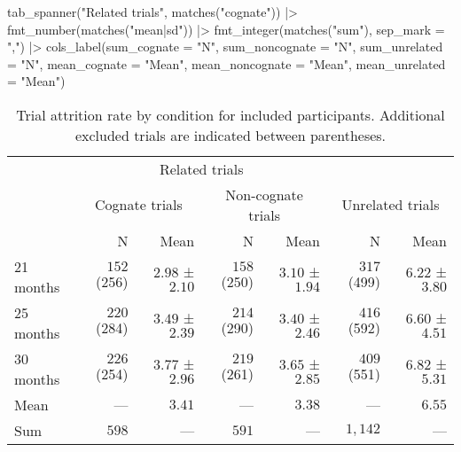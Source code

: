 \documentclass[
  letterpaper,
  DIV=11,
  numbers=noendperiod]{scrartcl}
\newenvironment{Shaded}{\begin{snugshade}}{\end{snugshade}}
\newcommand{\AttributeTok}[1]{\textcolor[rgb]{0.40,0.45,0.13}{#1}}
\newcommand{\FunctionTok}[1]{\textcolor[rgb]{0.28,0.35,0.67}{#1}}
\newcommand{\NormalTok}[1]{\textcolor[rgb]{0.00,0.23,0.31}{#1}}
\newcommand{\SpecialCharTok}[1]{\textcolor[rgb]{0.37,0.37,0.37}{#1}}
\newcommand{\StringTok}[1]{\textcolor[rgb]{0.13,0.47,0.30}{#1}}
\begin{document}
\begin{Shaded}
\begin{Highlighting}[]
    \FunctionTok{tab\_spanner}\NormalTok{(}\StringTok{"Related trials"}\NormalTok{, }\FunctionTok{matches}\NormalTok{(}\StringTok{"cognate"}\NormalTok{)) }\SpecialCharTok{|\textgreater{}}
    \FunctionTok{fmt\_number}\NormalTok{(}\FunctionTok{matches}\NormalTok{(}\StringTok{"mean|sd"}\NormalTok{)) }\SpecialCharTok{|\textgreater{}} 
    \FunctionTok{fmt\_integer}\NormalTok{(}\FunctionTok{matches}\NormalTok{(}\StringTok{"sum"}\NormalTok{), }\AttributeTok{sep\_mark =} \StringTok{","}\NormalTok{) }\SpecialCharTok{|\textgreater{}} 
    \FunctionTok{cols\_label}\NormalTok{(}\AttributeTok{sum\_cognate =} \StringTok{"N"}\NormalTok{,}
               \AttributeTok{sum\_noncognate =} \StringTok{"N"}\NormalTok{,}
               \AttributeTok{sum\_unrelated =} \StringTok{"N"}\NormalTok{,}
               \AttributeTok{mean\_cognate =} \StringTok{"Mean"}\NormalTok{,}
               \AttributeTok{mean\_noncognate =} \StringTok{"Mean"}\NormalTok{,}
               \AttributeTok{mean\_unrelated =} \StringTok{"Mean"}\NormalTok{)}
\end{Highlighting}
\end{Shaded}

\hypertarget{tbl-attrition-trials-vtarget}{}
\begin{longtable}{l|rrrrrr}
\caption{\label{tbl-attrition-trials-vtarget}Trial attrition rate by condition for included participants. Additional
excluded trials are indicated between parentheses. }\tabularnewline

\toprule
\multicolumn{1}{l}{} & \multicolumn{4}{c}{Related trials} &  &  \\ 
\cmidrule(lr){2-5}
\multicolumn{1}{l}{} & \multicolumn{2}{c}{Cognate trials} & \multicolumn{2}{c}{Non-cognate trials} & \multicolumn{2}{c}{Unrelated trials} \\ 
\cmidrule(lr){2-3} \cmidrule(lr){4-5} \cmidrule(lr){6-7}
\multicolumn{1}{l}{} & N & Mean & N & Mean & N & Mean \\ 
\midrule
21 months & $152$ (256) & $2.98$ ± $2.10$ & $158$ (250) & $3.10$ ± $1.94$ & $317$ (499) & $6.22$ ± $3.80$ \\ 
25 months & $220$ (284) & $3.49$ ± $2.39$ & $214$ (290) & $3.40$ ± $2.46$ & $416$ (592) & $6.60$ ± $4.51$ \\ 
30 months & $226$ (254) & $3.77$ ± $2.96$ & $219$ (261) & $3.65$ ± $2.85$ & $409$ (551) & $6.82$ ± $5.31$ \\ 
\midrule 
\midrule 
Mean & — & $3.41$ & — & $3.38$ & — & $6.55$ \\ 
Sum & $598$ & — & $591$ & — & $1,142$ & — \\ 
\bottomrule
\end{longtable}
\end{document}
